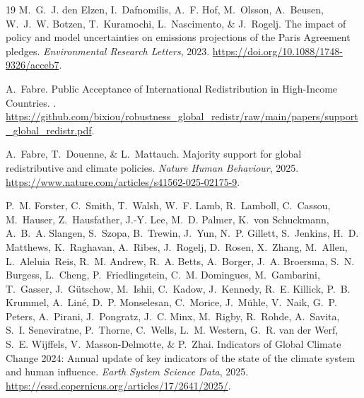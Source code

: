 \documentclass[12pt,english]{article}
\begin{document}
\begin{thebibliography}{19}
M.~G.~J. {den Elzen}, I.~Dafnomilis, A.~F. Hof, M.~Olsson, A.~Beusen, W.~J.~W.
  Botzen, T.~Kuramochi, L.~Nascimento, \& J.~Rogelj.
\newblock The impact of policy and model uncertainties on emissions projections
  of the {{Paris Agreement}} pledges.
\newblock \emph{Environmental Research Letters}, 2023.
\newblock \url{https://doi.org/10.1088/1748-9326/acceb7}.

A.~Fabre.
\newblock Public {{Acceptance}} of {{International Redistribution}} in
  {{High-Income Countries}}.
.
\newblock
  \url{https://github.com/bixiou/robustness\_global\_redistr/raw/main/papers/support\_global\_redistr.pdf}.

A.~Fabre, T.~Douenne, \& L.~Mattauch.
\newblock Majority support for global redistributive and climate policies.
\newblock \emph{Nature Human Behaviour}, 2025.
\newblock \url{https://www.nature.com/articles/s41562-025-02175-9}.

P.~M. Forster, C.~Smith, T.~Walsh, W.~F. Lamb, R.~Lamboll, C.~Cassou,
  M.~Hauser, Z.~Hausfather, J.-Y. Lee, M.~D. Palmer, K.~{von Schuckmann},
  A.~B.~A. Slangen, S.~Szopa, B.~Trewin, J.~Yun, N.~P. Gillett, S.~Jenkins,
  H.~D. Matthews, K.~Raghavan, A.~Ribes, J.~Rogelj, D.~Rosen, X.~Zhang,
  M.~Allen, L.~Aleluia~Reis, R.~M. Andrew, R.~A. Betts, A.~Borger, J.~A.
  Broersma, S.~N. Burgess, L.~Cheng, P.~Friedlingstein, C.~M. Domingues,
  M.~Gambarini, T.~Gasser, J.~G{\"u}tschow, M.~Ishii, C.~Kadow, J.~Kennedy,
  R.~E. Killick, P.~B. Krummel, A.~Lin{\'e}, D.~P. Monselesan, C.~Morice,
  J.~M{\"u}hle, V.~Naik, G.~P. Peters, A.~Pirani, J.~Pongratz, J.~C. Minx,
  M.~Rigby, R.~Rohde, A.~Savita, S.~I. Seneviratne, P.~Thorne, C.~Wells, L.~M.
  Western, G.~R. {van der Werf}, S.~E. Wijffels, V.~{Masson-Delmotte}, \&
  P.~Zhai.
\newblock Indicators of {{Global Climate Change}} 2024: Annual update of key
  indicators of the state of the climate system and human influence.
\newblock \emph{Earth System Science Data}, 2025.
\newblock \url{https://essd.copernicus.org/articles/17/2641/2025/}.


\end{thebibliography}
\end{document}
